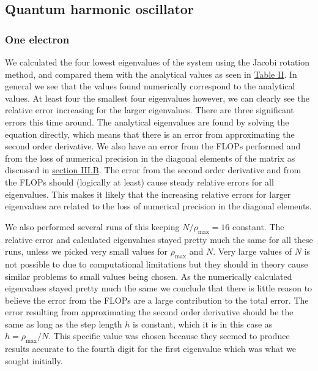 \documentclass[reprint,english,notitlepage]{revtex4-1}  %
\begin{document}
\subsection{Quantum harmonic oscillator} \label{sec:V:b}

\subsubsection{One electron} \label{sec:V:b:i}

We calculated the four lowest eigenvalues of the system using the Jacobi rotation method, and compared them with the analytical values as seen in \hyperref[table:IV:b:1]{Table II}. In general we see that the values found numerically correspond to the analytical values. At least four the smallest four eigenvalues however, we can clearly see the relative error increasing for the larger eigenvalues. There are three significant errors this time around. The analytical eigenvalues are found by solving the equation directly, which means that there is an error from approximating the second order derivative. We also have an error from the FLOPs performed and from the loss of numerical precision in the diagonal elements of the matrix as discussed in \hyperref[sec:III:b]{section III.B}. The error from the second order derivative and from the FLOPs should (logically at least) cause steady relative errors for all eigenvalues. This makes it likely that the increasing relative errors for larger eigenvalues are related to the loss of numerical precision in the diagonal elements.

We also performed several runs of this keeping $N/\rho_\text{max} = 16$ constant. The relative error and calculated eigenvalues stayed pretty much the same for all these runs, unless we picked very small values for $\rho_\text{max}$ and $N$. Very large values of $N$ is not possible to due to computational limitations but they should in theory cause similar problems to small values being chosen. As the numerically calculated eigenvalues stayed pretty much the same we conclude that there is little reason to believe the error from the FLOPs are a large contribution to the total error. The error resulting from approximating the second order derivative should be the same as long as the step length $h$ is constant, which it is in this case as $h = \rho_\text{max}/N$. This specific value was chosen because they seemed to produce results accurate to the fourth digit for the first eigenvalue which was what we sought initially.
\end{document}
